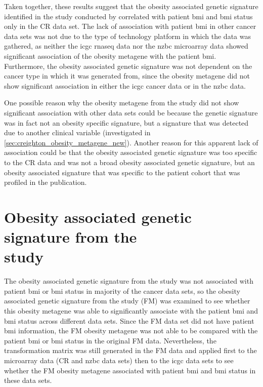 Taken together, these results suggest that the obesity associated genetic signature identified in the study conducted by \citet{Creighton2012} correlated with patient \gls{bmi} and \gls{bmi} status only in the CR data set.
The lack of association with patient \gls{bmi} in other cancer data sets was not due to the type of technology platform in which the data was gathered, as neither the \gls{icgc} \gls{rnaseq} data nor the \gls{nzbc} microarray data showed significant association of the obesity metagene with the patient \gls{bmi}.
Furthermore, the obesity associated genetic signature was not dependent on the cancer type in which it was generated from, since the obesity metagene did not show significant association in either the \gls{icgc} cancer data or in the \gls{nzbc} data.

One possible reason why the obesity metagene from the \citet{Creighton2012} study did not show significant association with other data sets could be because the genetic signature was in fact not an obesity specific signature, but a signature that was detected due to another clinical variable (investigated in \cref{sec:creighton_obesity_metagene_new}).
Another reason for this apparent lack of association could be that the obesity associated genetic signature was too specific to the CR data and was not a broad obesity associated genetic signature, but an obesity associated signature that was specific to the patient cohort that was profiled in the \citet{Creighton2012} publication.

\vspace{-3mm}

\section{Obesity associated genetic signature from the\\\citet{Fuentes-Mattei2014} study}
\label{sec:fm_obesity_metagene}

The obesity associated genetic signature from the \citet{Creighton2012} study was not associated with patient \gls{bmi} or \gls{bmi} status in majority of the cancer data sets, so the obesity associated genetic signature from the \citet{Fuentes-Mattei2014} study (FM) was examined to see whether this obesity metagene was able to significantly associate with the patient \gls{bmi} and \gls{bmi} status across different  data sets.
Since the FM data set did not have patient \gls{bmi} information, the FM obesity metagene was not able to be compared with the patient \gls{bmi} or \gls{bmi} status in the original FM data.
Nevertheless, the transformation matrix was still generated in the FM data and applied first to the microarray data (CR and \gls{nzbc} data sets) then to the \gls{icgc} data sets to see whether the FM obesity metagene associated with patient \gls{bmi} and \gls{bmi} status in these data sets.

